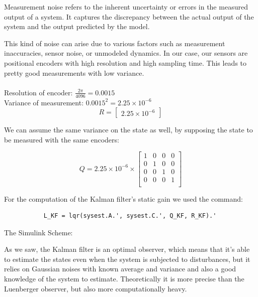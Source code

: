               Measurement noise refers to the inherent uncertainty or errors in the measured output of a system. It captures the discrepancy between the actual output of the system and the output predicted by the model. 
               
               This kind of noise can arise due to various factors such as measurement inaccuracies, sensor noise, or unmodeled dynamics. In our case, our sensors are positional encoders with high resolution and high sampling time. This leads to pretty good measurements with low variance.
\\
\\
Resolution of encoder: $\frac{2\pi}{4096} = 0.0015$\\
Variance of measurement:  $0.0015^2  = 2.25 \times 10^{-6}$\\
\[ 
    R = 
       \begin{bmatrix}
        2.25 \times 10^{-6}
       \end{bmatrix}
       \]

We can assume the same variance on the state as well, by supposing the state to be measured with the same encoders: 

\[ 
    Q = 2.25\times 10^{-6} \times
       \begin{bmatrix}
        1&0&0&0\\
        0&1&0&0\\
        0&0&1&0\\
        0&0&0&1\\
       \end{bmatrix}
       \]

       For the computation of the Kalman filter's static gain we used the command:
       \begin{verbatim}
           L_KF = lqr(sysest.A.', sysest.C.', Q_KF, R_KF).'
       \end{verbatim}



                The Simulink Scheme:


    As we saw, the Kalman filter is an optimal observer, which means that it's able to estimate the states even when the system is subjected to disturbances, but it relies on Gaussian noises with known average and variance and also a good knowledge of the system to estimate.
    Theoretically it is more precise than the Luenberger observer, but also more computationally heavy.
    
